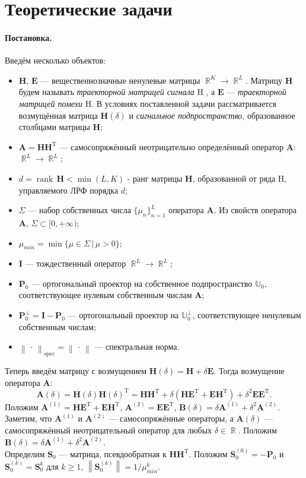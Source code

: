 \documentclass[specialist,
               substylefile = spbu_report.rtx,
               subf,href,colorlinks=true, 12pt]{disser}
\newcommand\norm[1]{\left\|#1\right\|}
\DeclareMathOperator\R{\mathbb{R}}
\DeclareMathOperator\rank{\textrm{rank}\,}
\newenvironment{statement}{\paragraph{Постановка.}}{\hfill}
\begin{document}
\section{Теоретические задачи}
\begin{statement}
Введём несколько объектов:
\begin{itemize}
	\item $\mathbf{H}$, $\mathbf{E}$ --- вещественнозначные ненулевые матрицы $\R^K \rightarrow \R^L$. Матрицу $\mathbf{H}$ будем называть \emph{траекторной матрицей сигнала} $\mathrm{H}$ , а $\mathbf{E}$ --- \emph{траекторной матрицей помехи} $\mathrm{H}$. В условиях поставленной задачи рассматривается возмущённая матрица $\mathbf{H}(\delta)$ и \emph{сигнальное подпространство}, образованное столбцами матрицы $\mathbf{H}$;
	\item  $\mathbf{A} = \mathbf{HH}^\mathrm{T}$ --- самосопряжённый неотрицательно определённый оператор $\mathbf{A}$: $\R^L \rightarrow \R^L$;
	\item $d = \rank\mathbf{H} < \min(L, K)$ - ранг матрицы $\mathbf{H}$, образованной от ряда $\mathrm{H}$, управляемого ЛРФ порядка $d$;
	\item $\Sigma$ --- набор собственных числа $\{\mu_n\}_{n=1}^L$ оператора $\mathbf{A}$. Из свойств оператора $\mathbf{A}$, $\Sigma \subset [0, +\infty)$;
	\item $\mu_{min} = \min\{\mu\in\Sigma\, |\, \mu > 0\}$;
	\item $\mathbf{I}$ --- тождественный оператор $\R^L \rightarrow \R^L$;
	\item $\mathbf{P}_0$ --- ортогональный проектор на собственное подпространство $\mathbb{U}_0$, соответствующее нулевым собственным числам $\mathbf{A}$;
	\item $\mathbf{P}^\bot_0 = \mathbf{I} - \mathbf{P}_0$ --- ортогональный проектор на $\mathbb{U}_0^\bot$, соответствующее ненулевым собственным числам;
	\item $\norm{\,\cdot\,}_{\mathrm{spec}}=\norm{\,\cdot\,}$ --- спектральная норма.
\end{itemize}
Теперь введём матрицу с возмущением $\mathbf{H}(\delta) = \mathbf{H} + \delta\mathbf{E}$. Тогда возмущение оператора $\mathbf{A}$:
\begin{equation*}
	\mathbf{A}(\delta) = \mathbf{H}(\delta)\mathbf{H}(\delta)^\mathrm{T} = \mathbf{H}\mathbf{H}^\mathrm{T} + \delta(\mathbf{H}\mathbf{E}^\mathrm{T} + \mathbf{E}\mathbf{H}^\mathrm{T}) + \delta^2\mathbf{E}\mathbf{E}^\mathrm{T}.
\end{equation*}
Положим $\mathbf{A}^{(1)} = \mathbf{H}\mathbf{E}^\mathrm{T} + \mathbf{E}\mathbf{H}^\mathrm{T}$, $\mathbf{A}^{(2)} = \mathbf{E}\mathbf{E}^\mathrm{T}$, $\mathbf{B}(\delta) = \delta\mathbf{A}^{(1)} + \delta^2\mathbf{A}^{(2)}$. Заметим, что $\mathbf{A}^{(1)}$ и $\mathbf{A}^{(2)}$ --- самосопряжённые операторы, а $\mathbf{A}(\delta)$ --- самосопряжённый неотрицательный оператор для любых $\delta\in\R$. Положим $\mathbf{B}(\delta)=\delta\mathbf{A}^{(1)} + \delta^2\mathbf{A}^{(2)}$.\\
Определим $\mathbf{S}_0$ --- матрица, псевдообратная к $\mathbf{HH}^\mathrm{T}$. Положим $\mathbf{S}_0^{(0)} = -\mathbf{P}_0$ и $\mathbf{S}_0^{(k)}=\mathbf{S}_0^k$ для $k\geqslant1$, $\norm{\mathbf{S}_0^{(k)}}=1/\mu_{min}^k$.


\end{statement}
\end{document}
